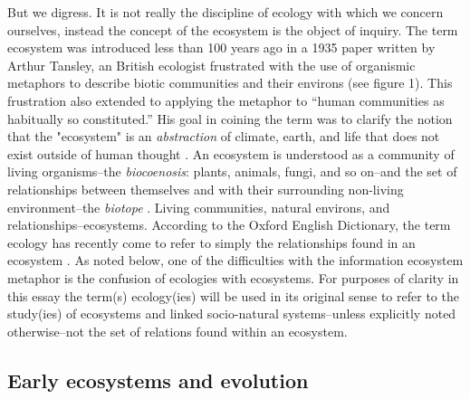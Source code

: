 But we digress. It is not really the discipline of ecology with which we concern ourselves, instead the concept of the ecosystem is the object of inquiry. The term ecosystem was introduced less than 100 years ago in a 1935 paper written by Arthur Tansley, an British ecologist frustrated with the use of organismic metaphors to describe biotic communities and their environs (see figure 1). This frustration also extended to applying the metaphor to “human communities as habitually so constituted.” His goal in coining the term was to clarify the notion that the "ecosystem" is an \textit{abstraction} of climate, earth, and life that does not exist outside of human thought \citep{tansley_1935}. An ecosystem is understood as a community of living organisms--the \textit{biocoenosis}: plants, animals, fungi, and so on--and the set of relationships between themselves and with their surrounding non-living environment--the \textit{biotope} \citep{tansley_1935, odum_1953}. Living communities, natural environs, and relationships--ecosystems. According to the Oxford English Dictionary, the term ecology has recently come to refer to simply the relationships found in an ecosystem \citep{oed_2008}. As noted below, one of the difficulties with the information ecosystem metaphor is the confusion of ecologies with ecosystems. For purposes of clarity in this essay the term(s) ecology(ies) will be used in its original sense to refer to the study(ies) of ecosystems and linked socio-natural systems--unless explicitly noted otherwise--not the set of relations found within an ecosystem. 

\subsection{Early ecosystems and evolution}

